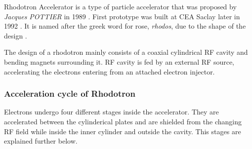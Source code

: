 \documentclass[a4paper,oneside,12pt]{report}
\numberwithin{equation}{chapter}
\begin{document}
Rhodotron Accelerator is a type of particle accelerator that was proposed by \textit{Jacques POTTIER} in 1989 \cite{rhodo_pottier}. 
First prototype was built at CEA Saclay later in 1992 \cite{rhodo_prototype}. It is named after the greek word for rose, \textit{rhodos}, due to the shape of the design \cite{rhodos}.

The design of a rhodotron mainly consists of a coaxial cylindrical RF cavity and bending magnets surrounding it. RF cavity is fed by an external RF source, accelerating the electrons entering from an attached electron injector.


\subsubsection{Acceleration cycle of Rhodotron}

Electrons undergo four different stages inside the accelerator. 
They are accelerated between the cylinderical plates and are shielded from the changing RF field while inside the inner cylinder and outside the cavity. 
This stages are explained further below.

\end{document}
